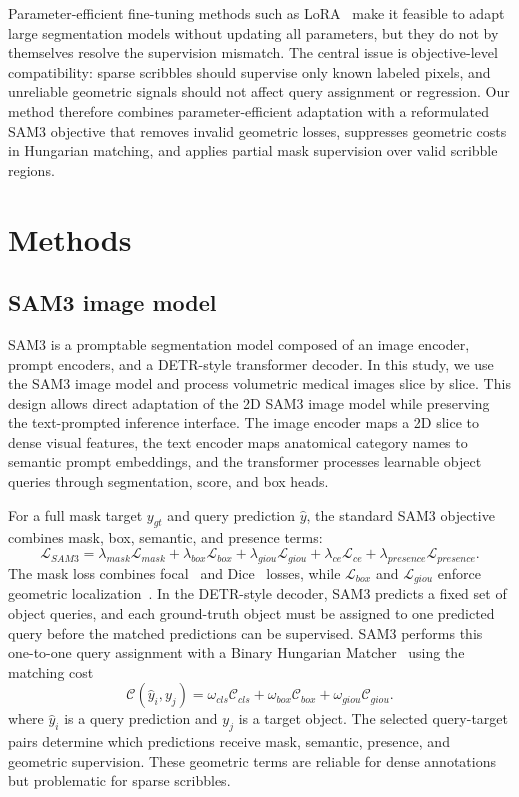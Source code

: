 \documentclass[preprint,12pt]{elsarticle}
\begin{document}
Parameter-efficient fine-tuning methods such as LoRA~\cite{hu2021lora} make it feasible to adapt large segmentation models without updating all parameters, but they do not by themselves resolve the supervision mismatch. The central issue is objective-level compatibility: sparse scribbles should supervise only known labeled pixels, and unreliable geometric signals should not affect query assignment or regression. Our method therefore combines parameter-efficient adaptation with a reformulated SAM3 objective that removes invalid geometric losses, suppresses geometric costs in Hungarian matching, and applies partial mask supervision over valid scribble regions.

\section{Methods}
\label{sec:methods}

\subsection{SAM3 image model}

SAM3 is a promptable segmentation model composed of an image encoder, prompt encoders, and a DETR-style transformer decoder. In this study, we use the SAM3 image model and process volumetric medical images slice by slice. This design allows direct adaptation of the 2D SAM3 image model while preserving the text-prompted inference interface. The image encoder maps a 2D slice to dense visual features, the text encoder maps anatomical category names to semantic prompt embeddings, and the transformer processes learnable object queries through segmentation, score, and box heads.

For a full mask target $y_{gt}$ and query prediction $\hat{y}$, the standard SAM3 objective combines mask, box, semantic, and presence terms:
\begin{equation}
    \mathcal{L}_{SAM3} =
    \lambda_{mask}\mathcal{L}_{mask}
    + \lambda_{box}\mathcal{L}_{box}
    + \lambda_{giou}\mathcal{L}_{giou}
    + \lambda_{ce}\mathcal{L}_{ce}
    + \lambda_{presence}\mathcal{L}_{presence}.
\end{equation}
The mask loss combines focal~\cite{Lin2017focal} and Dice~\cite{milletari2016dice} losses, while $\mathcal{L}_{box}$ and $\mathcal{L}_{giou}$ enforce geometric localization~\cite{rezatofighi2019giou}. In the DETR-style decoder, SAM3 predicts a fixed set of object queries, and each ground-truth object must be assigned to one predicted query before the matched predictions can be supervised. SAM3 performs this one-to-one query assignment with a Binary Hungarian Matcher~\cite{kuhn1955hungarian} using the matching cost
\begin{equation}
    \mathcal{C}(\hat{y}_i, y_j) =
    \omega_{cls}\mathcal{C}_{cls}
    + \omega_{box}\mathcal{C}_{box}
    + \omega_{giou}\mathcal{C}_{giou}.
\end{equation}
where $\hat{y}_i$ is a query prediction and $y_j$ is a target object. The selected query-target pairs determine which predictions receive mask, semantic, presence, and geometric supervision. These geometric terms are reliable for dense annotations but problematic for sparse scribbles.
\end{document}
